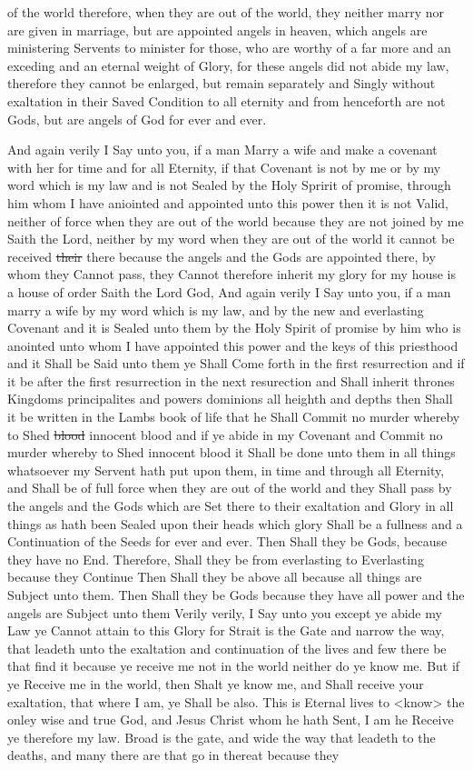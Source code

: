 of the world therefore, when they are out of the world, they neither marry nor are given in marriage, but are appointed angels in heaven, which angels are ministering Servents to minister for those, who are worthy of a far more and an exceding and an eternal weight of Glory, for these angels did not abide my law, therefore they cannot be enlarged, but remain separately and Singly without exaltation in their Saved Condition to all eternity and from henceforth are not Gods, but are angels of God for ever and ever.

				And again verily I Say unto you, if a man Marry a wife and make a covenant with her for time and for all Eternity, if that Covenant is not by me or by my word which is my law and is not Sealed by the Holy Spririt of promise, through him whom I have aniointed and appointed unto this power then it is not Valid, neither of force when they are out of the world because they are not joined by me Saith the Lord, neither by my word when they are out of the world it cannot be received \sout{their} there because the angels and the Gods are appointed there, by whom they Cannot pass, they Cannot therefore inherit my glory for my house is a house of order Saith the Lord God, And again verily I Say unto you, if a man marry a wife by my word which is my law, and by the new and everlasting Covenant and it is Sealed unto them by the Holy Spirit of promise by him who is anointed unto whom I have appointed this power and the keys of this priesthood and it Shall be Said unto them ye Shall Come forth in the first resurrection and if it be after the first resurrection in the next resurection and Shall inherit thrones Kingdoms principalites and powers dominions all heighth and depths then Shall it be written in the Lambs book of life that he Shall Commit no murder whereby to Shed \sout{blood} innocent blood and if ye abide in my Covenant and Commit no murder whereby to Shed innocent blood it Shall be done unto them in all things whatsoever my Servent hath put upon them, in time and through all Eternity, and Shall be of full force when they are out of the world and they Shall pass by the angels and the Gods which are Set there to their exaltation and Glory in all things as hath been Sealed upon their heads which glory Shall be a fullness and a Continuation of the Seeds for ever and ever. Then Shall they be Gods, because they have no End. Therefore, Shall they be from everlasting to Everlasting because they Continue Then Shall they be above all because all things are Subject unto them. Then Shall they be Gods because they have all power and the angels are Subject unto them Verily verily, I Say unto you except ye abide my Law ye Cannot attain to this Glory for Strait is the Gate and narrow the way, that leadeth unto the exaltation and continuation of the lives and few there be that find it because ye receive me not in the world neither do ye know me. But if ye Receive me in the world, then Shalt ye know me, and Shall receive your exaltation, that where I am, ye Shall be also. This is Eternal lives to <know> the onley wise and true God, and Jesus Christ whom he hath Sent, I am he Receive ye therefore my law. Broad is the gate, and wide the way that leadeth to the deaths, and many there are that go in thereat because they 
